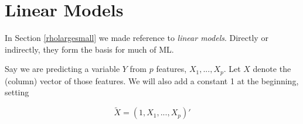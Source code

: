 \chapter{Linear Models}  
\label{chap:linmod}

In Section \ref{rholargesmall} we made reference to \textit{linear
models}.  Directly or indirectly, they form the basis for much of ML.

Say we are predicting a variable $Y$ from $p$ features, $X_1,...,X_p$.
Let $X$ denote the (column) vector of those features.  We will also
add a constant 1 at the beginning, setting

\begin{equation}
\widetilde{X} = (1,X_1,...,X_p)' 
\end{equation}

